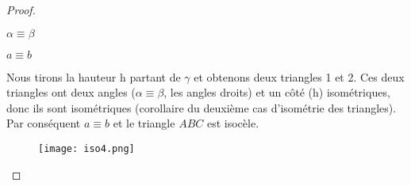 \documentclass[a4paper,12pt]{article}
\begin{document}
\begin{proof}
\begin{enumerate}
    \begin{hyp}
     $\alpha \equiv \beta$
    \end{hyp}
    \begin{concl}
     $a\equiv b$
    \end{concl}
    Nous tirons la hauteur h partant de $\gamma$ et obtenons deux triangles 1 et 2. Ces deux triangles ont deux angles ($\alpha \equiv \beta$, les angles droits) et un côté (h) isométriques, donc ils sont isométriques (corollaire du deuxième cas d'isométrie des triangles). Par conséquent $a\equiv b$ et le triangle $ABC$ est isocèle.
    
    \begin{figure}[H]
        \centering
        \texttt{[image: iso4.png]}
    \end{figure}
    
\end{enumerate}
\end{proof}
\end{document}
